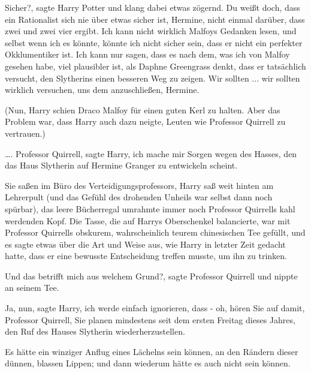 \glqq{}Sicher?\grqq{}, sagte Harry Potter und klang dabei etwas zögernd. \glqq{}Du
weißt doch, dass ein Rationalist sich nie über etwas sicher ist, Hermine, nicht
einmal darüber, dass zwei und zwei vier ergibt. Ich kann nicht wirklich Malfoys
Gedanken lesen, und selbst wenn ich es könnte, könnte ich nicht sicher sein,
dass er nicht ein perfekter Okklumentiker ist. Ich kann nur sagen, dass es nach
dem, was ich von Malfoy gesehen habe, viel plausibler ist, als Daphne Greengrass
denkt, dass er tatsächlich versucht, den Slytherins einen besseren Weg zu
zeigen. Wir sollten ... wir sollten wirklich versuchen, uns dem anzuschließen,
Hermine.\grqq{}

(Nun, Harry schien Draco Malfoy für einen guten Kerl zu halten. Aber das Problem
war, dass Harry auch dazu neigte, Leuten wie Professor Quirrell zu vertrauen.)

…. \glqq{}Professor Quirrell\grqq{}, sagte Harry, \glqq{}ich mache mir Sorgen
wegen des Hasses, den das Haus Slytherin auf Hermine Granger zu entwickeln
scheint.\grqq{}

Sie saßen im Büro des Verteidigungsprofessors, Harry saß weit hinten am
Lehrerpult (und das Gefühl des drohenden Unheils war selbst dann noch spürbar),
das leere Bücherregal umrahmte immer noch Professor Quirrells kahl werdenden
Kopf. Die Tasse, die auf Harrys Oberschenkel balancierte, war mit Professor
Quirrells obskurem, wahrscheinlich teurem chinesischen Tee gefüllt, und es sagte
etwas über die Art und Weise aus, wie Harry in letzter Zeit gedacht hatte, dass
er eine bewusste Entscheidung treffen musste, um ihn zu trinken.

\glqq{}Und das betrifft mich aus welchem Grund?\grqq{}, sagte Professor Quirrell
und nippte an seinem Tee.

\glqq{}Ja, nun\grqq{}, sagte Harry, \glqq{}ich werde einfach ignorieren, dass -
oh, hören Sie auf damit, Professor Quirrell, Sie planen mindestens seit dem
ersten Freitag dieses Jahres, den Ruf des Hauses Slytherin
wiederherzustellen.\grqq{}

Es hätte ein winziger Anflug eines Lächelns sein können, an den Rändern dieser
dünnen, blassen Lippen; und dann wiederum hätte es auch nicht sein können.

